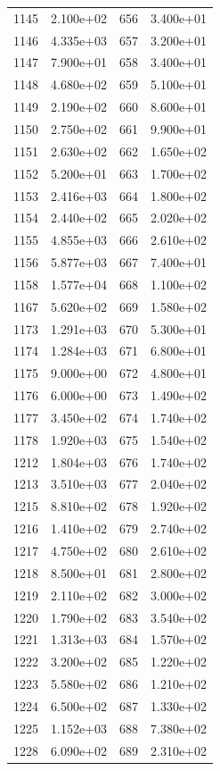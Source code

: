 \documentclass[12pt]{article}
\begin{document}
\begin{longtable}{@{}cccc@{}}
1145 & 2.100e+02 & 656 & 3.400e+01 \\
1146 & 4.335e+03 & 657 & 3.200e+01 \\
1147 & 7.900e+01 & 658 & 3.400e+01 \\
1148 & 4.680e+02 & 659 & 5.100e+01 \\
1149 & 2.190e+02 & 660 & 8.600e+01 \\
1150 & 2.750e+02 & 661 & 9.900e+01 \\
1151 & 2.630e+02 & 662 & 1.650e+02 \\
1152 & 5.200e+01 & 663 & 1.700e+02 \\
1153 & 2.416e+03 & 664 & 1.800e+02 \\
1154 & 2.440e+02 & 665 & 2.020e+02 \\
1155 & 4.855e+03 & 666 & 2.610e+02 \\
1156 & 5.877e+03 & 667 & 7.400e+01 \\
1158 & 1.577e+04 & 668 & 1.100e+02 \\
1167 & 5.620e+02 & 669 & 1.580e+02 \\
1173 & 1.291e+03 & 670 & 5.300e+01 \\
1174 & 1.284e+03 & 671 & 6.800e+01 \\
1175 & 9.000e+00 & 672 & 4.800e+01 \\
1176 & 6.000e+00 & 673 & 1.490e+02 \\
1177 & 3.450e+02 & 674 & 1.740e+02 \\
1178 & 1.920e+03 & 675 & 1.540e+02 \\
1212 & 1.804e+03 & 676 & 1.740e+02 \\
1213 & 3.510e+03 & 677 & 2.040e+02 \\
1215 & 8.810e+02 & 678 & 1.920e+02 \\
1216 & 1.410e+02 & 679 & 2.740e+02 \\
1217 & 4.750e+02 & 680 & 2.610e+02 \\
1218 & 8.500e+01 & 681 & 2.800e+02 \\
1219 & 2.110e+02 & 682 & 3.000e+02 \\
1220 & 1.790e+02 & 683 & 3.540e+02 \\
1221 & 1.313e+03 & 684 & 1.570e+02 \\
1222 & 3.200e+02 & 685 & 1.220e+02 \\
1223 & 5.580e+02 & 686 & 1.210e+02 \\
1224 & 6.500e+02 & 687 & 1.330e+02 \\
1225 & 1.152e+03 & 688 & 7.380e+02 \\
1228 & 6.090e+02 & 689 & 2.310e+02 \\

\end{longtable}
\end{document}
